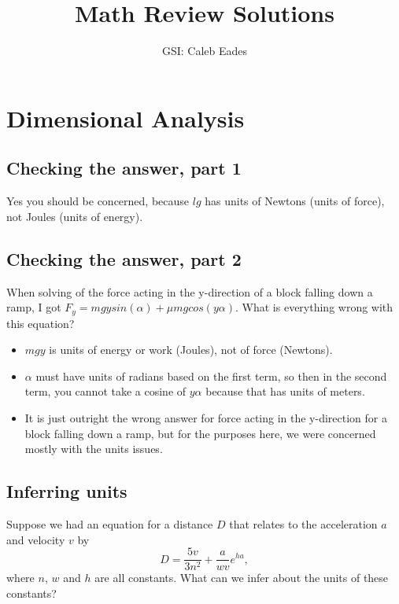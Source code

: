 \documentclass{article}
\begin{document}
	
\title{Math Review Solutions}
\author{GSI: Caleb Eades}
\maketitle

\section{Dimensional Analysis}

\subsection{Checking the answer, part 1}

Yes you should be concerned, because $lg$ has units of Newtons (units of force), not Joules (units of energy).

\subsection{Checking the answer, part 2}

When solving of the force acting in the y-direction of a block falling down a ramp, I got $F_y=mgysin(\alpha) + \mu mgcos(y\alpha)$. What is everything wrong with this equation?

\begin{itemize}
	\item $mgy$ is units of energy or work (Joules), not of force (Newtons).
	\item $\alpha$ must have units of radians based on the first term, so then in the second term, you cannot take a cosine of $y\alpha$ because that has units of meters.
	\item It is just outright the wrong answer for force acting in the y-direction for a block falling down a ramp, but for the purposes here, we were concerned mostly with the units issues.
\end{itemize}

\subsection{Inferring units}

Suppose we had an equation for a distance $D$ that relates to the acceleration $a$ and velocity $v$ by
\begin{equation}
D = \frac{5v}{3n^2} + \frac{a}{wv}e^{ha},
\end{equation}
where $n$, $w$ and $h$ are all constants. What can we infer about the units of these constants?
\end{document}
